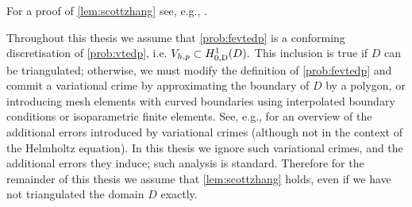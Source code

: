     For a proof of \cref{lem:scottzhang} see, e.g., \cite[Theorems 4.4.4 and 4.4.20 and Remark 4.4.27]{BrSc:08}.

    
    \label{rem:crimes}
    Throughout this thesis we assume that \cref{prob:fevtedp} is a conforming discretisation of \cref{prob:vtedp}, i.e. $\Vhp \subset \HozDD.$ This inclusion is true if $D$ can be triangulated; otherwise, we must modify the definition of \cref{prob:fevtedp} and commit a variational crime by approximating the boundary of $D$ by a polygon, or introducing mesh elements with curved boundaries using interpolated boundary conditions or isoparametric finite elements. See, e.g., \cite[Chapter 10]{BrSc:08} for an overview of the additional errors introduced by variational crimes (although not in the context of the Helmholtz equation). In this thesis we  ignore such variational crimes, and the additional errors they induce; such analysis is standard. Therefore for the remainder of this thesis we assume that \cref{lem:scottzhang} holds, even if we have not triangulated the domain $D$ exactly.
    \ere
    




